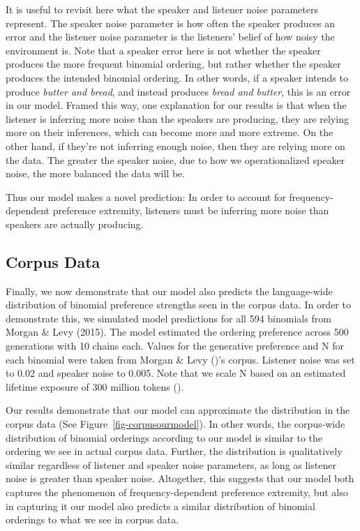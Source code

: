 \documentclass[
  12pt,
  letterpaper,
]{scrreprt}
\begin{document}
It is useful to revisit here what the speaker and listener noise
parameters represent. The speaker noise parameter is how often the
speaker produces an error and the listener noise parameter is the
listeners' belief of how noisy the environment is. Note that a speaker
error here is not whether the speaker produces the more frequent
binomial ordering, but rather whether the speaker produces the intended
binomial ordering. In other words, if a speaker intends to produce
\emph{butter and bread}, and instead produces \emph{bread and butter},
this is an error in our model. Framed this way, one explanation for our
results is that when the listener is inferring more noise than the
speakers are producing, they are relying more on their inferences, which
can become more and more extreme. On the other hand, if they're not
inferring enough noise, then they are relying more on the data. The
greater the speaker noise, due to how we operationalized speaker noise,
the more balanced the data will be.

Thus our model makes a novel prediction: In order to account for
frequency-dependent preference extremity, listeners must be inferring
more noise than speakers are actually producing.

\subsection{Corpus Data}\label{corpus-data}

Finally, we now demonstrate that our model also predicts the
language-wide distribution of binomial preference strengths seen in the
corpus data. In order to demonstrate this, we simulated model
predictions for all 594 binomials from Morgan \& Levy (2015). The model
estimated the ordering preference across 500 generations with 10 chains
each. Values for the generative preference and N for each binomial were
taken from Morgan \& Levy ()'s corpus.
Listener noise was set to 0.02 and speaker noise to 0.005. Note that we
scale N based on an estimated lifetime exposure of 300 million tokens
().

Our results demonstrate that our model can approximate the distribution
in the corpus data (See Figure~\ref{fig-corpusourmodel}). In other
words, the corpus-wide distribution of binomial orderings according to
our model is similar to the ordering we see in actual corpus data.
Further, the distribution is qualitatively similar regardless of
listener and speaker noise parameters, as long as listener noise is
greater than speaker noise. Altogether, this suggests that our model
both captures the phenomenon of frequency-dependent preference
extremity, but also in capturing it our model also predicts a similar
distribution of binomial orderings to what we see in corpus data.
\end{document}
